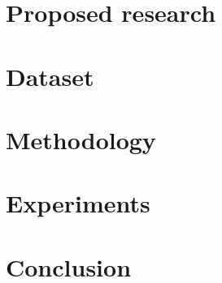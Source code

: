 \documentclass[10pt,twocolumn,letterpaper]{article}
\begin{document}
\section{Proposed research}


\section{Dataset}


\section{Methodology}


\section{Experiments}



\section{Conclusion}



{\small


}
\end{document}

